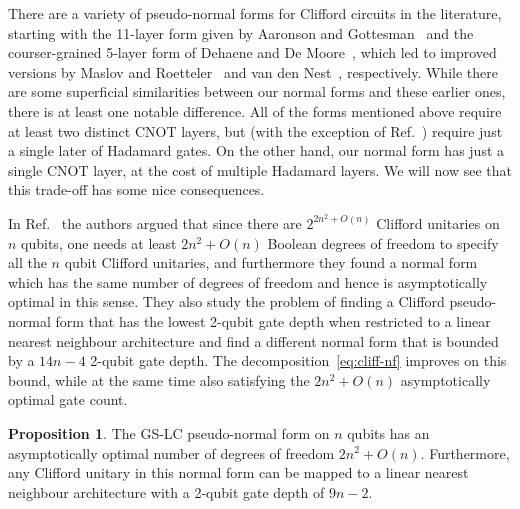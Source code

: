 \documentclass[a4paper,onecolumn,superscriptaddress,11pt,accepted=2020-04-27]{quantumarticle}
\theoremstyle{definition}
\newtheorem{proposition}[theorem]{Proposition}
\begin{document}
There are a variety of pseudo-normal forms for Clifford circuits in the literature, starting with the 11-layer form given by Aaronson and Gottesman~\cite{aaronsongottesman2004} and the courser-grained 5-layer form of Dehaene and De Moore~\cite{dehaene2003clifford}, which led to improved versions by Maslov and Roetteler~\cite{maslov2018shorter} and van den Nest~\cite{nest2010clifford}, respectively. While there are some superficial similarities between our normal forms and these earlier ones, there is at least one notable difference. All of the forms mentioned above require at least two distinct CNOT layers, but (with the exception of Ref.~\cite{aaronsongottesman2004}) require just a single later of Hadamard gates. On the other hand, our normal form has just a single CNOT layer, at the cost of multiple Hadamard layers. We will now see that this trade-off has some nice consequences.


In Ref.~\cite{maslov2018shorter} the authors argued that since there are $2^{2n^2 +O(n)}$ Clifford unitaries on $n$ qubits, one needs at least $2n^2 + O(n)$ Boolean degrees of freedom to specify all the $n$ qubit Clifford unitaries, and furthermore they found a normal form which has the same number of degrees of freedom and hence is asymptotically optimal in this sense. They also study the problem of finding a Clifford pseudo-normal form that has the lowest 2-qubit gate depth when restricted to a linear nearest neighbour architecture and find a different normal form that is bounded by a $14n-4$ 2-qubit gate depth. The decomposition~\eqref{eq:cliff-nf} improves on this bound, while at the same time also satisfying the $2n^2 + O(n)$ asymptotically optimal gate count.

\begin{proposition}\label{prop:cliff-gate-depth}
    The GS-LC pseudo-normal form on $n$ qubits has an asymptotically optimal number of degrees of freedom $2n^2 + O(n)$. Furthermore, any Clifford unitary in this normal form can be mapped to a linear nearest neighbour architecture with a 2-qubit gate depth of $9n-2$.
\end{proposition}
\end{document}
